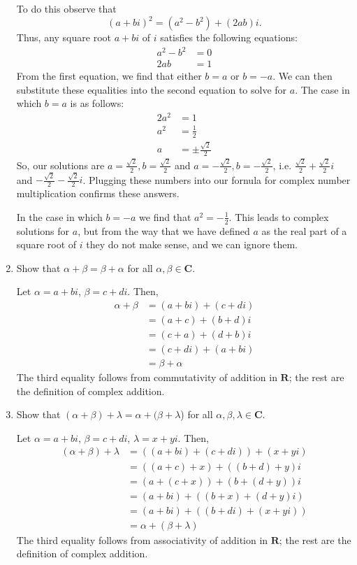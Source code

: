 \documentclass{book}
\begin{document}
\begin{enumerate}
To do this observe that \[(a+bi)^2=(a^2-b^2)+(2ab)i.\]  Thus, any square root \(a+bi\) of \(i\) satisfies the following equations:
\begin{align*}
a^2-b^2 &= 0 \\
2ab &= 1
\end{align*}
From the first equation, we find that either \(b = a\) or \(b=-a\).  We can then substitute these equalities into the second equation to solve for \(a\).  The case in which \(b = a\) is as follows:
\begin{align*}
2a^2 &= 1 \\
a^2 &= \frac{1}{2} \\
a &= \pm\frac{\sqrt{2}}{2}
\end{align*}
So, our solutions are \(a=\frac{\sqrt{2}}{2},b=\frac{\sqrt{2}}{2}\) and \(a=-\frac{\sqrt{2}}{2},b=-\frac{\sqrt{2}}{2}\), i.e. \(\frac{\sqrt{2}}{2}+\frac{\sqrt{2}}{2}i\) and \(-\frac{\sqrt{2}}{2}-\frac{\sqrt{2}}{2}i\).  Plugging these numbers into our fornula for complex number multiplication confirms these answers.

In the case in which \(b=-a\) we find that \(a^2=-\frac{1}{2}\).  This leads to complex solutions for \(a\), but from the way that we have defined \(a\) as the real part of a square root of \(i\) they do not make sense, and we can ignore them.

\item Show that \(\alpha+\beta=\beta+\alpha\) for all \(\alpha, \beta \in \textbf{C}\).

Let \(\alpha = a+bi\), \(\beta = c+di\).  Then,
\begin{equation*}
\begin{split}
\alpha+\beta&=(a+bi)+(c+di) \\
&=(a+c)+(b+d)i \\
&=(c+a)+(d+b)i \\
&= (c+di)+(a+bi) \\
&=\beta+\alpha
\end{split}
\end{equation*}
The third equality follows from commutativity of addition in \(\textbf{R}\); the rest are the definition of complex addition.

\item Show that \((\alpha+\beta)+\lambda=\alpha+(\beta+\lambda\)) for all  \(\alpha, \beta, \lambda \in \textbf{C}\).

Let \(\alpha = a+bi\), \(\beta = c+di\), \(\lambda=x+yi\).  Then,
\begin{equation*}
\begin{split}
(\alpha+\beta)+\lambda&=((a+bi)+(c+di))+(x+yi) \\
&=((a+c)+x)+((b+d)+y)i \\
&=(a+(c+x))+(b+(d+y))i \\
&=(a+bi)+((b+x) +(d+y)i) \\
&=(a+bi)+((b+di)+(x+yi)) \\
&=\alpha+(\beta+\lambda)
\end{split}
\end{equation*}
The third equality follows from associativity of addition in \(\textbf{R}\); the rest are the definition of complex addition.


\end{enumerate}
\end{document}
